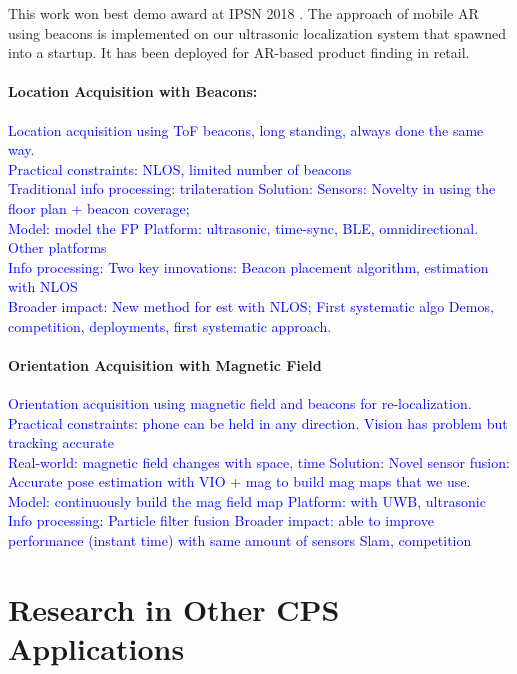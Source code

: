 \documentclass[10pt]{article}
\begin{document}
This work won best demo award at IPSN 2018 \cite{rajagopal2018welcome}. The approach of mobile AR using beacons is implemented on our ultrasonic localization system that spawned into a startup. It has been deployed for AR-based product finding in retail. 




\paragraph{Location Acquisition with Beacons: }
\textcolor{blue}{
Location acquisition using ToF beacons, long standing, always done the same way.\\
Practical constraints: NLOS, limited number of beacons\\
Traditional info processing: trilateration 
Solution:
Sensors: Novelty in using the floor plan + beacon coverage;\\
Model: model the FP
Platform: ultrasonic, time-sync, BLE, omnidirectional. Other platforms\\
Info processing: Two key innovations: Beacon placement algorithm, estimation with NLOS\\
Broader impact:
New method for est with NLOS;
First systematic algo 
Demos, competition, deployments, first systematic approach.
}
\paragraph{Orientation Acquisition with Magnetic Field}
\textcolor{blue}{
Orientation acquisition using magnetic field and beacons for re-localization.\\
Practical constraints: phone can be held in any direction. Vision has problem but tracking accurate\\
Real-world: magnetic field changes with space, time
Solution:
Novel sensor fusion: Accurate pose estimation with VIO + mag to build mag maps that we use.\\
Model: continuously build the mag field map
Platform: with UWB, ultrasonic
Info processing: 
Particle filter fusion
Broader impact: 
able to improve performance (instant time) with same amount of sensors
Slam, competition
}

\section{Research in Other CPS Applications}
\end{document}
